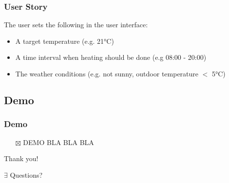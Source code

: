 \documentclass[aspectratio=169]{beamer}
\begin{document}
\begin{frame}
\frametitle{User Story}
The user sets the following in the user interface:
\begin{itemize}
\item A target temperature (e.g. 21°C)
\item A time interval when heating should be done (e.g 08:00 - 20:00)
\item The weather conditions (e.g. not sunny, outdoor temperature  $<$ 5°C)
\end{itemize}
\end{frame}

\subsection{Demo}
\begin{frame}
\frametitle{Demo}

\begin{itemize}
 \item[$\boxtimes$] DEMO BLA BLA BLA
\end{itemize}
\end{frame}

\begin{frame}
\Huge{\centerline{Thank you!}}
\Huge{\centerline{$\exists$ Questions?}}
\end{frame}
\end{document}
